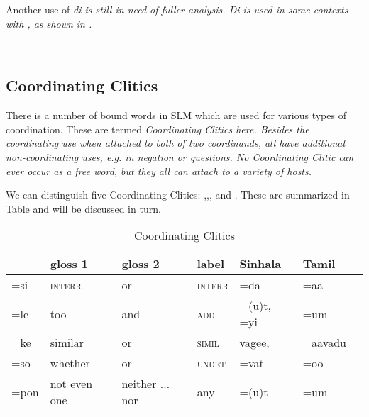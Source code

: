  \\
 \\
Another use of \em di \em  is still in need of fuller analysis. \em Di \em is used in some contexts with , as shown in .


 \\

\subsection{Coordinating Clitics}\label{sec:morph:CoordinatingClitics}
There is a number of bound words in SLM which are used for various types of coordination. These are termed \em Coordinating Clitics \em here. Besides the coordinating use when attached to both of two coordinands, all have additional non-coordinating uses, e.g. in negation or questions. No Coordinating Clitic can ever occur as a free word, but they all can attach to a variety of hosts.

We can distinguish five Coordinating Clitics: ,,, and . These are summarized in Table  and will be discussed in turn.

\begin{table}
	\centering
		\begin{tabular}{lllllll}
& gloss 1 & gloss 2  & label  &  Sinhala & Tamil \\
\hline
=si	& \textsc{interr} & or	& \textsc{interr} & =da & =aa \\
=le	& too		& and	& \textsc{add} &  =(u)t, =yi & =um \\
=ke	& similar	& or 	& \textsc{simil}  &  vagee, &  =aavadu\\
=so	& whether	& or	& \textsc{undet} &  =vat & =oo \\
=pon 	& not even one	& neither $\dots$ nor & any & =(u)t & =um\\
	\end{tabular}
	\caption{Coordinating Clitics}
	\label{tab:BooleanClitics}
\end{table}

